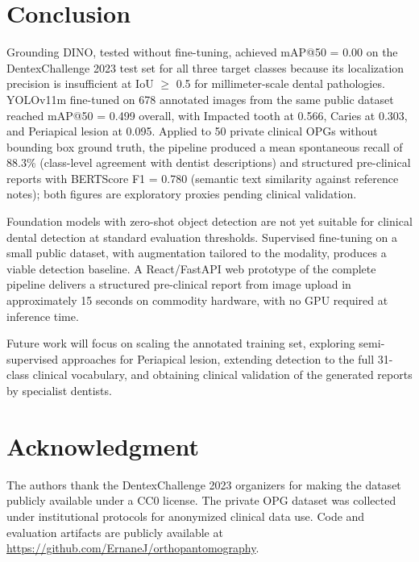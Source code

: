 \documentclass[conference]{IEEEtran}
\begin{document}
\section{Conclusion}

Grounding DINO, tested without fine-tuning, achieved mAP@50 = 0.00 on the DentexChallenge 2023 test set for all three target classes because its localization precision is insufficient at IoU $\geq$ 0.5 for millimeter-scale dental pathologies. YOLOv11m fine-tuned on 678 annotated images from the same public dataset reached mAP@50 = 0.499 overall, with Impacted tooth at 0.566, Caries at 0.303, and Periapical lesion at 0.095. Applied to 50 private clinical OPGs without bounding box ground truth, the pipeline produced a mean spontaneous recall of 88.3\% (class-level agreement with dentist descriptions) and structured pre-clinical reports with BERTScore F1 = 0.780 (semantic text similarity against reference notes); both figures are exploratory proxies pending clinical validation.

Foundation models with zero-shot object detection are not yet suitable for clinical dental detection at standard evaluation thresholds. Supervised fine-tuning on a small public dataset, with augmentation tailored to the modality, produces a viable detection baseline. A React/FastAPI web prototype of the complete pipeline delivers a structured pre-clinical report from image upload in approximately 15 seconds on commodity hardware, with no GPU required at inference time.

Future work will focus on scaling the annotated training set, exploring semi-supervised approaches for Periapical lesion, extending detection to the full 31-class clinical vocabulary, and obtaining clinical validation of the generated reports by specialist dentists.

\section*{Acknowledgment}

The authors thank the DentexChallenge 2023 organizers for making the dataset publicly available under a CC0 license. The private OPG dataset was collected under institutional protocols for anonymized clinical data use. Code and evaluation artifacts are publicly available at \url{https://github.com/ErnaneJ/orthopantomography}.



\end{document}
